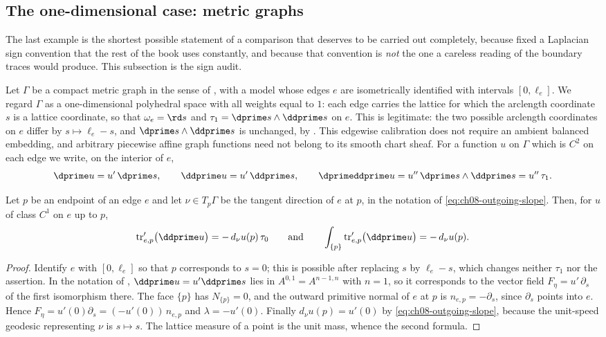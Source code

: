 \subsection{The one-dimensional case: metric graphs}
\label{sec:ch11-graph-green}

The last example is the shortest possible statement of a comparison that
deserves to be carried out completely, because  fixed
a Laplacian sign convention that the rest of the book uses constantly, and
because that convention is \emph{not} the one a careless reading of the
boundary traces would produce.  This subsection is the sign audit.

Let $\Gamma$ be a compact metric graph in the sense of
, with a model whose edges $e$ are isometrically
identified with intervals $[0,\ell_e]$.  We regard $\Gamma$ as a
one-dimensional polyhedral space with all weights equal to $1$: each edge
carries the lattice for which the arclength coordinate $s$ is a lattice
coordinate, so that $\omega_e=\rd s$ and $\tau_1=\dprime s\wedge\ddprime s$
on $e$.  This is legitimate: the two possible arclength coordinates on $e$
differ by $s\mapsto\ell_e-s$, and $\dprime s\wedge\ddprime s$ is unchanged,
by .  This edgewise calibration does
not require an ambient balanced embedding, and arbitrary piecewise
affine graph functions need not belong to its smooth chart sheaf.
For a function $u$ on $\Gamma$
which is $C^2$ on each edge we write, on the interior of $e$,
\[
 \dprime u=u'\,\dprime s,\qquad
 \ddprime u=u'\,\ddprime s,\qquad
 \dprimeddprime u=u''\,\dprime s\wedge\ddprime s=u''\,\tau_1 .
\]

\begin{lemma}
\label{lem:ch11-graph-trace}
Let $p$ be an endpoint of an edge $e$ and let $\nu\in T_p\Gamma$ be the
tangent direction of $e$ at $p$, in the notation of
\eqref{eq:ch08-outgoing-slope}.  Then, for $u$ of class $C^1$ on $e$ up to
$p$,
\[
 \operatorname{tr}'_{e,p}\bigl(\ddprime u\bigr)
 =-\,d_\nu u(p)\,\tau_0
 \qquad\text{and}\qquad
 \int_{\{p\}}\operatorname{tr}'_{e,p}\bigl(\ddprime u\bigr)=-\,d_\nu u(p).
\]
\end{lemma}

\begin{proof}
Identify $e$ with $[0,\ell_e]$ so that $p$ corresponds to $s=0$; this is
possible after replacing $s$ by $\ell_e-s$, which changes neither
$\tau_1$ nor the assertion.  In the notation of
, $\ddprime u=u'\ddprime s$ lies in
$A^{0,1}=A^{n-1,n}$ with $n=1$, so it corresponds to the vector field
$F_\eta=u'\,\partial_s$ of the first isomorphism there.  The face $\{p\}$ has
$N_{\{p\}}=0$, and the outward primitive normal of $e$ at $p$ is
$n_{e,p}=-\partial_s$, since $\partial_s$ points into $e$.  Hence
$F_\eta=u'(0)\partial_s=(-u'(0))\,n_{e,p}$
and $\lambda=-u'(0)$.  Finally $d_\nu u(p)=u'(0)$ by
\eqref{eq:ch08-outgoing-slope}, because the unit-speed geodesic
representing $\nu$ is $s\mapsto s$.  The lattice measure of a point is the
unit mass, whence the second formula.
\end{proof}

